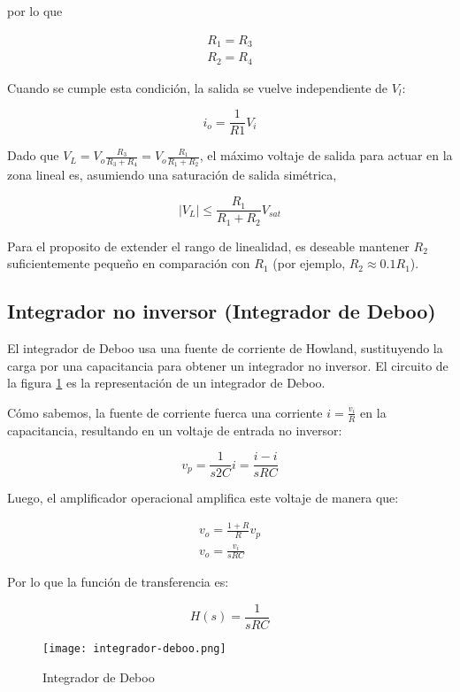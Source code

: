 por lo que 

\begin{align}
    \boxed{R_1 = R_3} \\
    \boxed{R_2 = R_4} 
\end{align}

Cuando se cumple esta condición, la salida se vuelve independiente de $V_l$:

\begin{equation}
    \boxed{i_o = \frac{1}{R1} V_i}
    \label{eq:mt-io-fuente-corriente}
\end{equation}

Dado que $V_L = V_o \frac{R_3}{R_3 + R_4} = V_o \frac{R_1}{R_1 + R_2}$, el máximo  voltaje de salida para actuar en la zona lineal es, asumiendo una saturación de salida simétrica,  

\begin{equation}
    \left| V_L \right| \leq  \frac{R_1}{R_1 + R_2} V_{sat}
\end{equation}

Para el proposito de extender el rango de linealidad, es deseable mantener $R_2$ suficientemente pequeño en comparación	con $R_1$ (por ejemplo, $R_2 \approx 0.1 R_1$).

\subsection{Integrador no inversor (Integrador de Deboo)}

El integrador de Deboo usa una fuente de corriente de Howland, sustituyendo la carga por una capacitancia para obtener un integrador no inversor. El circuito de la figura \ref{fig:mt-integrador-deboo} es la representación de un integrador de Deboo.

Cómo sabemos, la fuente de corriente fuerca una corriente $i = \frac{v_i}{R}$ en la capacitancia, resultando en un voltaje de entrada no inversor:

\begin{equation*}
    v_p = \frac{1}{s2C} i = \frac{i-i}{sRC}
\end{equation*}

Luego, el amplificador operacional amplifica este voltaje de manera que:

\begin{align*}
    v_o = \frac{1 + R}{R} v_p \\
    v_o = \frac{v_i}{sRC}
\end{align*}

Por lo que la función de transferencia es: 

\begin{equation}
    H(s) = \frac{1}{sRC}
    \label{eq:mt-func-transferencia-integrador-deboo}
\end{equation}

\begin{figure}[ht]
    \centering
    \texttt{[image: integrador-deboo.png]}
    \caption{Integrador de Deboo}
    \label{fig:mt-integrador-deboo}
\end{figure}


